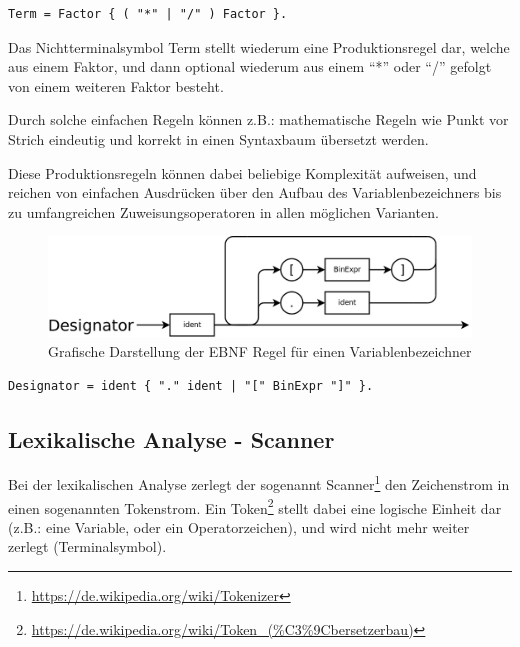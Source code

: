 \begin{lstlisting}[language=EBNF]
Term = Factor { ( "*" | "/" ) Factor }.
\end{lstlisting}

Das Nichtterminalsymbol Term stellt wiederum eine Produktionsregel dar, welche aus einem Faktor, und dann optional wiederum aus einem ``*'' oder ``/'' gefolgt von einem weiteren Faktor besteht.

Durch solche einfachen Regeln können z.B.: mathematische Regeln wie Punkt vor Strich eindeutig und korrekt in einen Syntaxbaum übersetzt werden.

Diese Produktionsregeln k\"onnen dabei beliebige Komplexit\"at aufweisen, und reichen von einfachen Ausdr\"ucken \"uber den Aufbau des Variablenbezeichners bis zu umfangreichen Zuweisungsoperatoren in allen m\"oglichen Varianten.

\begin{figure}[h]
\centering
\includegraphics[width=\textwidth]{./media/images/compiler/ebnf_designator.png}
\caption{Grafische Darstellung der EBNF Regel f\"ur einen Variablenbezeichner}
\label{compiler_ebnf_designator}
\end{figure}

\begin{lstlisting}[language=EBNF]
Designator = ident { "." ident | "[" BinExpr "]" }.
\end{lstlisting}


\newpage
\subsection{Lexikalische Analyse - Scanner}

Bei der lexikalischen Analyse zerlegt der sogenannt Scanner\footnote{\url{https://de.wikipedia.org/wiki/Tokenizer}} den Zeichenstrom in einen sogenannten Tokenstrom. Ein Token\footnote{\url{https://de.wikipedia.org/wiki/Token_(\%C3\%9Cbersetzerbau)}} stellt dabei eine logische Einheit dar (z.B.: eine Variable, oder ein Operatorzeichen), und wird nicht mehr weiter zerlegt (Terminalsymbol).

